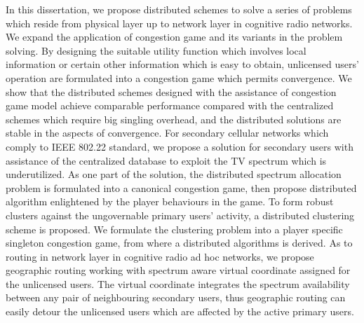 In this dissertation, we propose distributed schemes to solve a series of problems which reside from physical layer up to network layer in cognitive radio networks.
We expand the application of congestion game and its variants in the problem solving.
By designing the suitable utility function which involves local information or certain other information which is easy to obtain, unlicensed users' operation are formulated into a congestion game which permits convergence.
We show that the distributed schemes designed with the assistance of congestion game model achieve comparable performance compared with the centralized schemes which require big singling overhead, and the distributed solutions are stable in the aspects of convergence.
%
For secondary cellular networks which comply to IEEE 802.22 standard, we propose a solution for secondary users with assistance of the centralized database to exploit the TV spectrum which is underutilized.
As one part of the solution, the distributed spectrum allocation problem is formulated into a canonical congestion game, then propose distributed algorithm enlightened by the player behaviours in the game.
%
To form robust clusters against the ungovernable primary users' activity, a distributed clustering scheme is proposed.
We formulate the clustering problem into a player specific singleton congestion game, from where a distributed algorithms is derived.
%
As to routing in network layer in cognitive radio ad hoc networks, we propose geographic routing working with spectrum aware virtual coordinate assigned for the unlicensed users.
The virtual coordinate integrates the spectrum availability between any pair of neighbouring secondary users, thus geographic routing can easily detour the unlicensed users which are affected by the active primary users.
%


